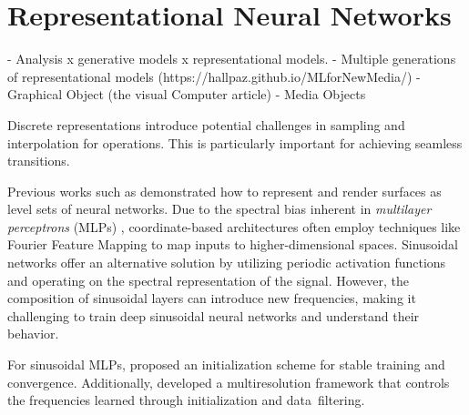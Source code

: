 \section{Representational Neural Networks}

- Analysis x generative models x representational models. 
    - Multiple generations of representational models (https://hallpaz.github.io/MLforNewMedia/)
- Graphical Object (the visual Computer article)
- Media Objects


Discrete representations introduce potential challenges in sampling and interpolation for operations. This is particularly important for achieving seamless transitions.


Previous works such as \cite{park2019deepsdf, occupancy_networks, sitzmann2019siren, novello2022differential, 
novello2023neural,
silva2022mip-plicits,
yariv2020multiview} demonstrated how to represent and render surfaces as level sets of neural networks. 
Due to the spectral bias inherent in \textit{multilayer perceptrons} (MLPs) \cite{Rahaman2018O}, coordinate-based architectures often employ techniques like Fourier Feature Mapping \cite{tancik2020fourfeat} to map inputs to higher-dimensional spaces. Sinusoidal networks offer an alternative solution by utilizing periodic activation functions and operating on the spectral representation of the signal. However, the composition of sinusoidal layers can introduce new frequencies, making it challenging to train deep sinusoidal neural networks \cite{taming2017} and understand their behavior. 

For sinusoidal MLPs, \citet{sitzmann2019siren} proposed an initialization scheme for stable training and convergence. Additionally, \citet{paz2022} developed a multiresolution framework that controls the frequencies learned through initialization and data~filtering.